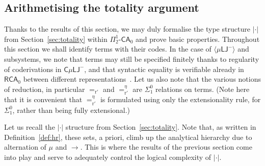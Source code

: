 \documentclass[10pt,a4paper]{amsart}
\theoremstyle{plain}
\theoremstyle{definition}
\newcommand{\anupam}[1]{\todo[color=green]{A: #1}}
\renewcommand{\todo}[1]{}
\renewcommand{\anupam}[1]{}
\theoremstyle{plain}
\theoremstyle{definition} %
\newcommand{\closure}[1]{\langle #1 \rangle}
\newcommand{\clomuLJneg}{\closure{\muLJneg}}
\newcommand{\arrow}{\to}
\newcommand{\LJ}{\mathsf{LJ}}
\newcommand{\muLJ}{\mu\LJ}
\newcommand{\muLJneg}{\muLJ^-}
\newcommand{\circular}{\mathsf C}
\newcommand{\cmuLJ}{\circular\muLJ}
\newcommand{\cmuLJneg}{\cmuLJ^-}
\newcommand{\reductionnorec}{\mathrm{r}'}
\newcommand{\convertsnorec}{=_{\reductionnorec}}
\newcommand{\convertsnoreceta}{=_{\reductionnorec}^\eta} %
\newcommand{\Sin}[2]{\Sigma^{#1}_{#2}}
\newcommand{\Pin}[2]{\Pi^{#1}_{#2}}
\newcommand{\CA}{\mathsf{CA}}
\newcommand{\ca}[1]{#1\text{-}\CA}
\newcommand{\RCA}{\mathsf R \CA_0}
\newcommand{\PSCA}{\ca{\Pin 1 2 }_0}
\newcommand{\hr}[1]{|#1|}
\newcommand{\HR}{\hr \cdot}
\begin{document}
\subsection{Arithmetising the totality argument}




Thanks to the results of this section, we may duly formalise the type structure $\HR$ from Section~\ref{sec:totality} within $\PSCA$ and prove basic properties.
% 
% 
Throughout this section we shall identify terms with their codes. In the case of $\clomuLJneg$ and subsystems, we note that terms may still be specified finitely thanks to regularity of coderivations in $\cmuLJneg$, and that syntactic equality is verifiable already in $\RCA$ between different representations~\cite{Das21:CT-preprint,Das21:CT-fscd}.
Let us also note that the various notions of reduction, in particular $\convertsnorec$ and $\convertsnoreceta $ are $\Sin 0 1$ relations on terms. (Note here that it is convenient that $\convertsnoreceta$ is formulated using only the extensionality rule, for $\Sin 0 1$, rather than being fully extensional.)

Let us recall the $\HR$ structure from Section~\ref{sec:totality}. 
Note that, as written in Definition~\ref{def:hr},
these sets, a priori, climb up the analytical hierarchy due to alternation of $\mu$ and $\arrow$.
This is where the results of the previous section come into play and serve to adequately control the logical complexity of $\HR$.




\end{document}
